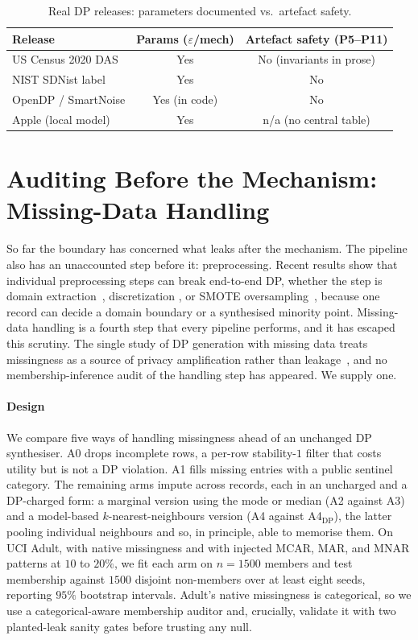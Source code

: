 \documentclass[conference]{IEEEtran}
\newcommand{\eps}{\varepsilon}
\begin{document}
\begin{table}[t]
\caption{Real DP releases: parameters documented vs.\ artefact safety.}
\label{tab:cases}
\centering
\begin{tabular}{lcc}
\toprule
Release & Params ($\eps$/mech) & Artefact safety (P5--P11) \\
\midrule
US Census 2020 DAS & Yes & No (invariants in prose) \\
NIST SDNist label  & Yes & No \\
OpenDP / SmartNoise & Yes (in code) & No \\
Apple (local model) & Yes & n/a (no central table) \\
\bottomrule
\end{tabular}
\end{table}

\section{Auditing Before the Mechanism: Missing-Data Handling}\label{sec:imp}
So far the boundary has concerned what leaks after the mechanism. The pipeline also has an unaccounted
step before it: preprocessing. Recent results show that individual preprocessing steps can break
end-to-end DP, whether the step is domain extraction~\cite{ganev_domain}, discretization
\cite{ganev_discrete}, or SMOTE oversampling~\cite{ganev_smote}, because one record can decide a domain
boundary or a synthesised minority point. Missing-data handling is a fourth step that every pipeline
performs, and it has escaped this scrutiny. The single study of DP generation with missing data treats
missingness as a source of privacy amplification rather than leakage~\cite{mohapatra2024}, and no
membership-inference audit of the handling step has appeared. We supply one.

\paragraph{Design} We compare five ways of handling missingness ahead of an unchanged DP synthesiser.
A0 drops incomplete rows, a per-row stability-$1$ filter that costs utility but is not a DP violation.
A1 fills missing entries with a public sentinel category. The remaining arms impute across records,
each in an uncharged and a DP-charged form: a marginal version using the mode or median (A2 against A3)
and a model-based $k$-nearest-neighbours version (A4 against A4$_{\text{DP}}$), the latter pooling
individual neighbours and so, in principle, able to memorise them. On UCI Adult, with native
missingness and with injected MCAR, MAR, and MNAR patterns at $10$ to $20\%$, we fit each arm on
$n{=}1500$ members and test membership against $1500$ disjoint non-members over at least eight seeds,
reporting $95\%$ bootstrap intervals. Adult's native missingness is categorical, so we use a
categorical-aware membership auditor and, crucially, validate it with two planted-leak sanity gates
before trusting any null.
\end{document}

